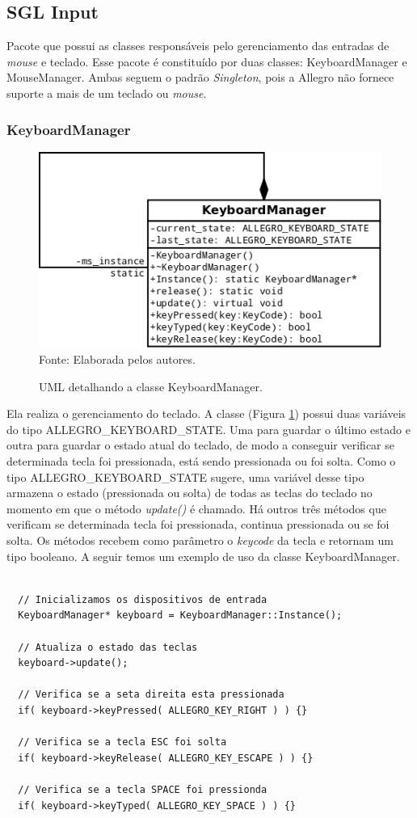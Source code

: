 \subsection{SGL Input}
%
%
Pacote que possui as classes responsáveis pelo gerenciamento das entradas de \textit{mouse} e teclado. Esse pacote é constituído por duas classes: KeyboardManager e MouseManager. Ambas seguem o padrão \textit{Singleton}, pois a Allegro não fornece suporte a mais de um teclado ou \textit{mouse}.
%
%
\subsubsection{KeyboardManager}
%
%
%
\begin{figure}[h]
    \centering
    \caption{UML detalhando a classe KeyboardManager.}
    \label{KeyboardManager}
    \includegraphics[scale = 0.6]{uml/KeyboardManager.png}
    \\Fonte: Elaborada pelos autores.
\end{figure}
%
%
Ela realiza o gerenciamento do teclado. A classe (Figura \ref{KeyboardManager}) possui duas variáveis do tipo ALLEGRO\_KEYBOARD\_STATE. Uma para guardar o último estado e outra para guardar o estado atual do teclado, de modo a conseguir verificar se determinada tecla foi pressionada, está sendo pressionada ou foi solta. Como o tipo ALLEGRO\_KEYBOARD\_STATE sugere, uma variável desse tipo armazena o estado (pressionada ou solta) de todas as teclas do teclado no momento em que o método \textit{update()} é chamado. Há outros três métodos que verificam se determinada tecla foi pressionada, continua pressionada ou se foi solta. Os métodos recebem como parâmetro o \textit{keycode} da tecla e retornam um tipo booleano. A seguir temos um exemplo de uso da classe KeyboardManager.
%
%
\begin{lstlisting}

  // Inicializamos os dispositivos de entrada
  KeyboardManager* keyboard = KeyboardManager::Instance();
  
  // Atualiza o estado das teclas
  keyboard->update();
	
  // Verifica se a seta direita esta pressionada
  if( keyboard->keyPressed( ALLEGRO_KEY_RIGHT ) ) {}
  
  // Verifica se a tecla ESC foi solta
  if( keyboard->keyRelease( ALLEGRO_KEY_ESCAPE ) ) {}
  
  // Verifica se a tecla SPACE foi pressionda
  if( keyboard->keyTyped( ALLEGRO_KEY_SPACE ) ) {}
	      
\end{lstlisting}
%

